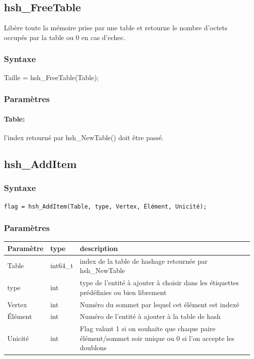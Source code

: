 \documentclass[a4paper,12pt]{article}
\begin{document}
\subsection{hsh\_FreeTable}
Libère toute la mémoire prise par une table et retourne le nombre d'octets occupés par la table ou 0 en cas d'echec.

\subsubsection*{Syntaxe}
Taille = hsh\_FreeTable(Table);

\subsubsection*{Paramètres}
\paragraph{Table:} l'index retourné par hsh\_NewTable() doit être passé.


\subsection{hsh\_AddItem}

\subsubsection*{Syntaxe}
{\tt flag = hsh\_AddItem(Table, type, Vertex, Élément, Unicité);}

\subsubsection*{Paramètres}
\begin{tabular}{|m{3cm}|m{2cm}|m{8.5cm}|}
\hline
Paramètre  & type     & description \\
\hline
Table      & int64\_t  & index de la table de hashage retournée par hsh\_NewTable \\
\hline
type       & int      & type de l'entité à ajouter à choisir dans les étiquettes prédéfinies ou bien librement \\
\hline
Vertex     & int      & Numéro du sommet par lequel cet élément est indexé \\
\hline
Élément    & int      & Numéro de l'entité à ajouter à la table de hash \\
\hline
Unicité    & int      & Flag valant 1 si on souhaite que chaque paire élément/sommet soir unique ou 0 si l'on accepte les doublons \\
\hline
\end{tabular}
\end{document}
